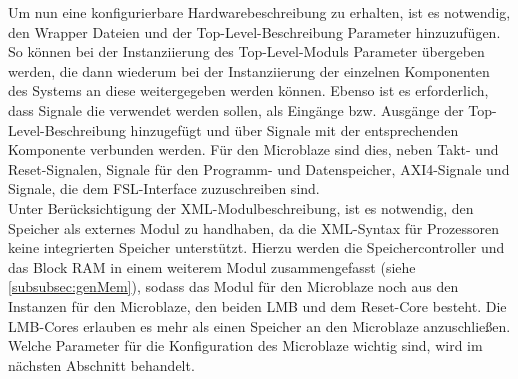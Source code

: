 Um nun eine konfigurierbare Hardwarebeschreibung zu erhalten, ist es notwendig, den Wrapper Dateien und der Top-Level-Beschreibung Parameter hinzuzufügen. So können bei der Instanziierung des Top-Level-Moduls Parameter übergeben werden, die dann wiederum bei der Instanziierung der einzelnen Komponenten des Systems an diese weitergegeben werden können. Ebenso ist es erforderlich, dass Signale die verwendet werden sollen, als Eingänge bzw. Ausgänge der Top-Level-Beschreibung hinzugefügt und über Signale mit der entsprechenden Komponente verbunden werden. Für den Microblaze sind dies, neben Takt- und Reset-Signalen, Signale für den Programm- und Datenspeicher, AXI4-Signale und Signale, die dem FSL-Interface zuzuschreiben sind.\\
Unter Berücksichtigung der XML-Modulbeschreibung, ist es notwendig, den Speicher als externes Modul zu handhaben, da die XML-Syntax für Prozessoren keine integrierten Speicher unterstützt. Hierzu werden die Speichercontroller und das Block RAM in einem weiterem Modul zusammengefasst (siehe \ref{subsubsec:genMem}), sodass das Modul für den Microblaze noch aus den Instanzen für den Microblaze, den beiden LMB und dem Reset-Core besteht. Die LMB-Cores erlauben es mehr als einen Speicher an den Microblaze anzuschließen.\\
Welche Parameter für die Konfiguration des Microblaze wichtig sind, wird im nächsten Abschnitt behandelt. 
